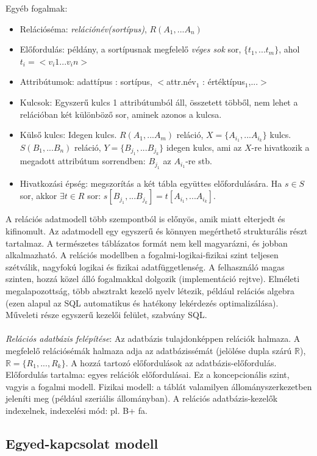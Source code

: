 \documentclass[margin=0px]{article}
\begin{document}
	Egyéb fogalmak:
	\begin{itemize}
		\item Relációséma: \textit{relációnév(sortípus)}, $R(A_1,...A_n)$
		\item Előfordulás: példány, a sortípusnak megfelelő \textit{véges sok} sor, $\{t_1,...t_m\}$, ahol $t_i = <v_i1...v_in>$
		\item Attribútumok: adattípus : sortípus, $<$attr.név$_1$ : értéktípus$_1$,...$>$
		\item Kulcsok: Egyszerű kulcs 1 attribútumból áll, összetett többől, nem lehet a relációban két különböző sor, aminek azonos a kulcsa.
		\item Külső kulcs: Idegen kulcs. $R(A_1,...A_m)$ reláció, $X=\{A_{i_1},...A_{i_k}\}$ kulcs. $S(B_1,...B_n)$ reláció, $Y=\{B_{j_1},...B_{j_k}\}$ idegen kulcs, ami az $X$-re hivatkozik a megadott attribútum sorrendben: $B_{j_1}$ az $A_{i_1}$-re stb.
		\item Hivatkozási épség: megszorítás a két tábla együttes előfordulására. Ha $s \in S$ sor, akkor $\exists t \in R$ sor: $s[B_{j_1},...B_{j_k}] = t[A_{i_1},...A_{i_k}]$.
	\end{itemize}
	A relációs adatmodell több szempontból is előnyös, amik miatt elterjedt és kifinomult. Az adatmodell egy egyszerű és könnyen megérthető strukturális részt tartalmaz. A természetes táblázatos formát nem kell magyarázni, és jobban alkalmazható. A relációs modellben a fogalmi-logikai-fizikai szint teljesen szétválik, nagyfokú logikai és fizikai adatfüggetlenség. A felhasználó magas szinten, hozzá közel álló fogalmakkal dolgozik (implementáció rejtve). Elméleti megalapozottság, több absztrakt kezelő nyelv létezik, például relációs algebra (ezen alapul az SQL automatikus és hatékony lekérdezés optimalizálása). Műveleti része egyszerű kezelői felület, szabvány SQL. \\ \\ 
	
	\textit{Relációs adatbázis felépítése}: Az adatbázis tulajdonképpen relációk halmaza. A megfelelő relációsémák halmaza adja az adatbázissémát (jelölése dupla szárú $\mathbb{R}$), $\mathbb{R} = \{R_1 , ... , R_k\}$. A hozzá tartozó előfordulások az adatbázis-előfordulás. Előfordulás tartalma: egyes relációk előfordulásai. Ez a koncepcionális szint, vagyis a fogalmi modell. Fizikai modell: a táblát valamilyen állományszerkezetben jeleníti meg (például szeriális állományban). A relációs adatbázis-kezelők indexelnek, indexelési mód: pl. B+ fa.
	
	\subsection{Egyed-kapcsolat modell}
	
\end{document}

